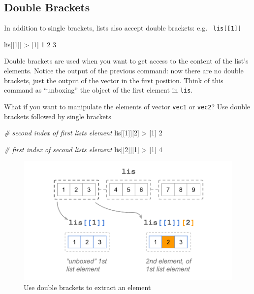 \documentclass[
]{book}
\newenvironment{Shaded}{\begin{snugshade}}{\end{snugshade}}
\newcommand{\CommentTok}[1]{\textcolor[rgb]{0.56,0.35,0.01}{\textit{#1}}}
\newcommand{\DecValTok}[1]{\textcolor[rgb]{0.00,0.00,0.81}{#1}}
\newcommand{\NormalTok}[1]{#1}
\newcommand{\SpecialCharTok}[1]{\textcolor[rgb]{0.00,0.00,0.00}{#1}}
\begin{document}
\hypertarget{double-brackets}{%
\subsection{Double Brackets}\label{double-brackets}}

In addition to single brackets, lists also accept double brackets: e.g.~
\texttt{lis{[}{[}1{]}{]}}

\begin{Shaded}
\begin{Highlighting}[]
\NormalTok{lis[[}\DecValTok{1}\NormalTok{]]}
\SpecialCharTok{\textgreater{}}\NormalTok{ [}\DecValTok{1}\NormalTok{] }\DecValTok{1} \DecValTok{2} \DecValTok{3}
\end{Highlighting}
\end{Shaded}

Double brackets are used when you want to get access to the content of the
list's elements. Notice the output of the previous command: now there are no
double brackets, just the output of the vector in the first position. Think
of this command as ``unboxing'' the object of the first element in \texttt{lis}.

What if you want to manipulate the elements of vector \texttt{vec1} or \texttt{vec2}? Use
double brackets followed by single brackets

\begin{Shaded}
\begin{Highlighting}[]
\CommentTok{\# second index of first list\textquotesingle{}s element}
\NormalTok{lis[[}\DecValTok{1}\NormalTok{]][}\DecValTok{2}\NormalTok{]}
\SpecialCharTok{\textgreater{}}\NormalTok{ [}\DecValTok{1}\NormalTok{] }\DecValTok{2}

\CommentTok{\# first index of second list\textquotesingle{}s element}
\NormalTok{lis[[}\DecValTok{2}\NormalTok{]][}\DecValTok{1}\NormalTok{]}
\SpecialCharTok{\textgreater{}}\NormalTok{ [}\DecValTok{1}\NormalTok{] }\DecValTok{4}
\end{Highlighting}
\end{Shaded}

\begin{figure}

{\centering \includegraphics[width=0.75\linewidth]{images/objects/obj-list-brackets3} 

}

\caption{Use double brackets to extract an element}\label{fig:unnamed-chunk-152}
\end{figure}
\end{document}

